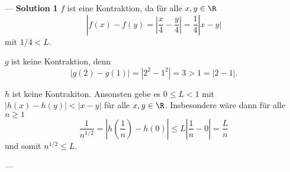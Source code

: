 \par---\newline
\textbf{Solution{}}
\textbf{1}\newline
 $f$ ist eine Kontraktion, da für alle $x,y \in \R$
 \[
  |f(x)-f(y) = \left| \frac{x}{4} - \frac{y}{4} \right| = \frac{1}{4}|x-y|
 \]
 mit $1/4 < L$.

 $g$ ist keine Kontraktion, denn
 \[
  |g(2)-g(1)| = |2^2 - 1^2| = 3 > 1 = |2-1|.
 \]

 $h$ ist keine Kontrakiton. Ansonsten gebe es $0 \leq L < 1$ mit $|h(x)-h(y)| < |x-y|$ für alle $x, y \in \R$. Insbesondere wäre dann für alle $n \geq 1$
 \[
  \frac{1}{n^{1/2}}
  = \left|h\left(\frac{1}{n}\right) - h(0)\right|
  \leq L\left| \frac{1}{n} - 0\right|
  = \frac{L}{n}
 \]
 und somit $n^{1/2} \leq L$.
\par---\newline
